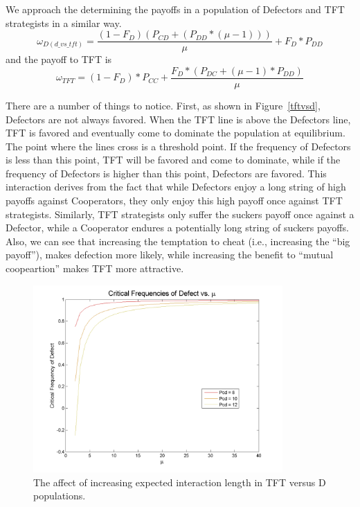 \documentclass[11pt]{article} %
\begin{document}
We approach the determining the payoffs in a population of Defectors and TFT strategists in a similar way.
\begin{equation}
	\omega_{D(d\_vs\_tft)} = \frac{(1 - F_{D})(P_{CD} + (P_{DD} * (\mu - 1)))}{\mu} + F_D * P_{DD}
	\label{d_in_dvstft}
\end{equation}
and  the payoff to TFT is
\begin{equation}
	\omega_{TFT} = (1-F_{D}) * P_{CC} + \frac{F_{D} * (P_{DC} + (\mu - 1) * P_{DD})}{\mu}
	\label{tft_in_dvstft}
\end{equation}

There are a number of things to notice. First, as shown in Figure~\ref{tftvsd}, Defectors are not always favored. When the TFT line is above the Defectors line, TFT is favored and eventually come to dominate the population at equilibrium. The point where the lines cross is a threshold point. If the frequency of Defectors is less than this point, TFT will be favored and come to dominate, while if the frequency of Defectors is higher than this point, Defectors are favored. This interaction derives from the fact that while Defectors enjoy a long string of high payoffs against Cooperators, they only enjoy this high payoff once against TFT strategists. Similarly, TFT strategists only suffer the suckers payoff once against a Defector, while a Cooperator endures a potentially long string of suckers payoffs.  Also, we can see that increasing the temptation to cheat (i.e., increasing the ``big payoff''), makes defection more likely, while increasing the benefit to ``mutual coopeartion'' makes TFT more attractive. 

\begin{figure}[ht]
	\centering
	\includegraphics[width=0.85\textwidth]{files/figures/fdcrit.png}
	\caption{The affect of increasing expected interaction length in TFT versus D populations.}
	\label{muintft}
\end{figure}
\end{document}
